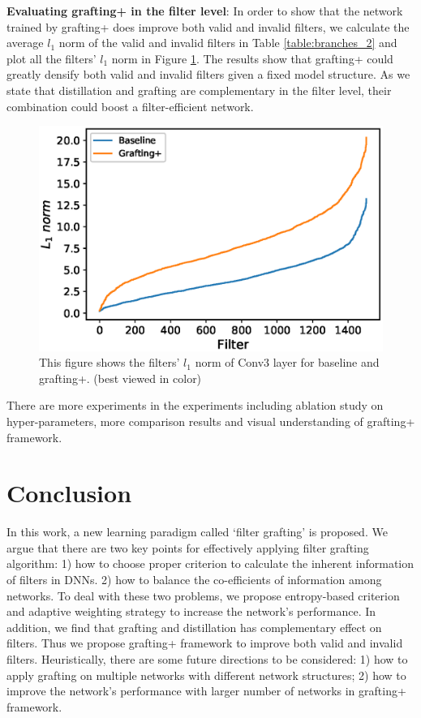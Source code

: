 \documentclass{article}
\begin{document}
\textbf{Evaluating grafting+ in the filter level}: 
In order to show that the network trained by grafting+ does improve both valid and invalid filters, we calculate the average $l_{1}$ norm of the valid and invalid filters in Table \ref{table:branches_2} and plot all the filters' $l_{1}$ norm in Figure \ref{figure:filter_norm}. The results show that grafting+ could greatly densify both valid and invalid filters given a fixed model structure. As we state that distillation and grafting are complementary in the filter level, their combination could boost a filter-efficient network. 

\begin{figure}[!t]
	\centering
	\includegraphics[width=15cm,]{fig/filter.eps}
	\caption{This figure shows the filters' $l_{1}$ norm of Conv3 layer for baseline and grafting+. (best viewed in color)}
	\label{figure:filter_norm}
\end{figure}	

There are more experiments in the experiments including ablation study on hyper-parameters, more comparison results and visual understanding of grafting+ framework.

\section{Conclusion}
In this work, a new learning paradigm called ‘filter grafting’ is proposed. We argue that there are two key points for effectively applying filter grafting algorithm: 1) how to choose proper criterion to calculate the inherent information of filters in DNNs. 2) how to balance the co-efficients of information among networks. To deal with these two problems, we propose entropy-based criterion and adaptive weighting strategy to increase the network’s performance. In addition, we find that grafting and distillation has complementary effect on filters. Thus we propose grafting+ framework to improve both valid and invalid filters. Heuristically, there are some future directions to be considered: 1) how to apply grafting on multiple networks with different network structures; 2) how to improve the network’s performance with larger number of networks in grafting+ framework.

\small


\end{document}
